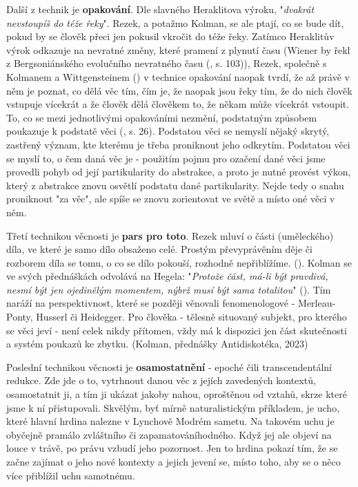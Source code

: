 \documentclass[11pt,a4paper]{article}
\begin{document}
Další z technik je \textbf{opakování}. Dle slavného Heraklitova výroku, "\textit{dvakrát nevstoupíš do téže řeky}". Rezek, a potažmo Kolman, se ale ptají, co se bude dít, pokud by se člověk přeci jen pokusil vkročit do téže řeky. Zatímco Heraklitův výrok odkazuje na nevratné změny, které pramení z plynutí času (Wiener by řekl z Bergsoniánského evolučního nevratného času (\cite{wiener_cybernetics_2019}, s. 103)), Rezek, společně s Kolmanem a Wittgensteinem (\cite{wittgenstein_tractatus_2010}) v technice opakování naopak tvrdí, že až právě v něm je poznat, co dělá věc tím, čím je, že naopak jsou řeky tím, že do nich člověk vstupuje vícekrát a že člověk dělá člověkem to, že někam může vícekrát vstoupit. To, co se mezi jednotlivými opakováními nezmění, podstatným způsobem poukazuje k podstatě věci (\cite{rezek_telo_2010}, s. 26). Podstatou věci se nemyslí nějaký skrytý, zastřený význam, kte kterému je třeba proniknout jeho odkrytím. Podstatou věci se myslí to, o čem daná věc je - použitím pojmu pro ozačení dané věci jsme provedli pohyb od její partikularity do abstrakce, a proto je nutné provést výkon, který z abstrakce znovu osvětlí podstatu dané partikularity. Nejde tedy o snahu proniknout "za věc", ale spíše se znovu zorientovat ve světě a místo oné věci v něm.

Třetí technikou věcnosti je \textbf{pars pro toto}. Rezek mluví o části (uměleckého) díla, ve které je samo dílo obsaženo celé. Prostým převyprávěním děje či rozborem díla se tomu, o co se dílo pokouší, rozhodně nepřiblížíme. (\cite{rezek_telo_2010}). Kolman se ve svých přednáškách odvolává na Hegela: "\textit{Protože část, má-li být pravdivá, nesmí být jen ojedinělým momentem, nýbrž musí být sama totalitou}" (\cite{hegel_mala_1992}). Tím naráží na perspektivnost, které se později věnovali fenomenologové - Merleau-Ponty, Husserl či Heidegger. Pro člověka - tělesně situovaný subjekt, pro kterého se věci jeví -  není celek nikdy přítomen, vždy má k dispozici jen část skutečnosti a systém poukazů ke zbytku. (Kolman, přednášky Antidiskotéka, 2023)

Poslední technikou věcnosti je \textbf{osamostatnění} - epoché čili transcendentální redukce. Zde jde o to, vytrhnout danou věc z jejích zavedených kontextů, osamostatnit ji, a tím ji ukázat jakoby nahou, oproštěnou od vztahů, skrze které jsme k ní přistupovali. Skvělým, byť mírně naturalistickým příkladem, je ucho, které hlavní hrdina nalezne v Lynchově Modrém sametu. Na takovém uchu je obyčejně pramálo zvláštního či zapamatováníhodného. Když jej ale objeví na louce v trávě, po právu vzbudí jeho pozornost. Jen to hrdina pokazí tím, že se začne zajímat o jeho nové kontexty a jejich jevení se, místo toho, aby se o něco více přiblížil uchu samotnému.
\end{document}

